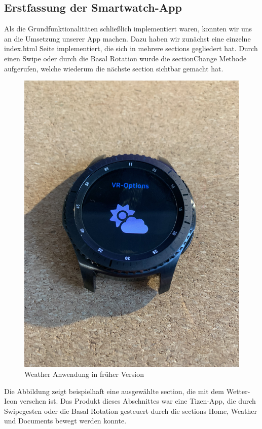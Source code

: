 \documentclass[12pt, a4paper]{article}
\begin{document}
\subsection{Erstfassung der Smartwatch-App}

Als die Grundfunktionalitäten schließlich implementiert waren, konnten wir uns an die Umsetzung unserer App machen. Dazu haben wir zunächst eine einzelne index.html Seite implementiert, die sich in mehrere sections gegliedert hat. Durch einen Swipe oder durch die Basal Rotation wurde die sectionChange Methode aufgerufen, welche wiederum die nächste section sichtbar gemacht hat. 


\begin{figure}[h]
	\centering
	\includegraphics[scale=.35]{assets/smartwatch_app_erstversion.jpg}
	\caption{Weather Anwendung in früher Version}
	\label{fig:app_erstversion}
\end{figure}

Die Abbildung zeigt beispielhaft eine ausgewählte section, die mit dem Wetter-Icon versehen ist. Das Produkt dieses Abschnittes war eine Tizen-App, die durch Swipegesten oder die Basal Rotation gesteuert durch die sections Home, Weather und Documents bewegt werden konnte. 
\end{document}

